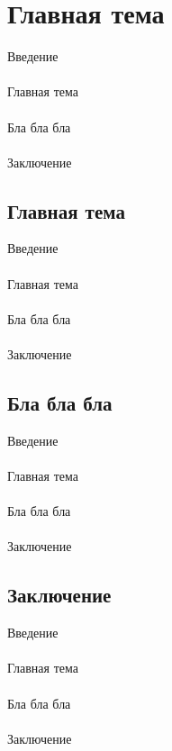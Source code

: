 \documentclass{article}
\begin{document}
\newpage
\section{Главная тема}
Введение\\
~\\
Главная тема\\
~\\
Бла бла бла\\
~\\
Заключение
\subsection{Главная тема}
Введение\\
~\\
Главная тема\\
~\\
Бла бла бла\\
~\\
Заключение
\subsection{Бла бла бла}
Введение\\
~\\
Главная тема\\
~\\
Бла бла бла\\
~\\
Заключение
\subsection{Заключение}
Введение\\
~\\
Главная тема\\
~\\
Бла бла бла\\
~\\
Заключение\\
~\\

\newpage
\end{document}
